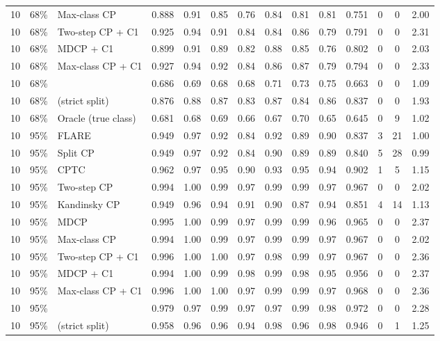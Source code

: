 \begin{longtable}{lllccccccccccc}
10 & 68\% & Max-class CP & 0.888 & 0.91 & 0.85 & 0.76 & 0.84 & 0.81 & 0.81 & 0.751 & 0 & 0 & 2.00 \\
10 & 68\% & Two-step CP + C1 & 0.925 & 0.94 & 0.91 & 0.84 & 0.84 & 0.86 & 0.79 & 0.791 & 0 & 0 & 2.31 \\
10 & 68\% & MDCP + C1 & 0.899 & 0.91 & 0.89 & 0.82 & 0.88 & 0.85 & 0.76 & 0.802 & 0 & 0 & 2.03 \\
10 & 68\% & Max-class CP + C1 & 0.927 & 0.94 & 0.92 & 0.84 & 0.86 & 0.87 & 0.79 & 0.794 & 0 & 0 & 2.33 \\
10 & 68\% & \gamut{} & 0.686 & 0.69 & 0.68 & 0.68 & 0.71 & 0.73 & 0.75 & 0.663 & 0 & 0 & 1.09 \\
10 & 68\% & \gamut{} (strict split) & 0.876 & 0.88 & 0.87 & 0.83 & 0.87 & 0.84 & 0.86 & 0.837 & 0 & 0 & 1.93 \\
10 & 68\% & Oracle (true class) & 0.681 & 0.68 & 0.69 & 0.66 & 0.67 & 0.70 & 0.65 & 0.645 & 0 & 9 & 1.02 \\
\midrule
10 & 95\% & FLARE & 0.949 & 0.97 & 0.92 & 0.84 & 0.92 & 0.89 & 0.90 & 0.837 & 3 & 21 & 1.00 \\
10 & 95\% & Split CP & 0.949 & 0.97 & 0.92 & 0.84 & 0.90 & 0.89 & 0.89 & 0.840 & 5 & 28 & 0.99 \\
10 & 95\% & CPTC & 0.962 & 0.97 & 0.95 & 0.90 & 0.93 & 0.95 & 0.94 & 0.902 & 1 & 5 & 1.15 \\
10 & 95\% & Two-step CP & 0.994 & 1.00 & 0.99 & 0.97 & 0.99 & 0.99 & 0.97 & 0.967 & 0 & 0 & 2.02 \\
10 & 95\% & Kandinsky CP & 0.949 & 0.96 & 0.94 & 0.91 & 0.90 & 0.87 & 0.94 & 0.851 & 4 & 14 & 1.13 \\
10 & 95\% & MDCP & 0.995 & 1.00 & 0.99 & 0.97 & 0.99 & 0.99 & 0.96 & 0.965 & 0 & 0 & 2.37 \\
10 & 95\% & Max-class CP & 0.994 & 1.00 & 0.99 & 0.97 & 0.99 & 0.99 & 0.97 & 0.967 & 0 & 0 & 2.02 \\
10 & 95\% & Two-step CP + C1 & 0.996 & 1.00 & 1.00 & 0.97 & 0.98 & 0.99 & 0.97 & 0.967 & 0 & 0 & 2.36 \\
10 & 95\% & MDCP + C1 & 0.994 & 1.00 & 0.99 & 0.98 & 0.99 & 0.98 & 0.95 & 0.956 & 0 & 0 & 2.37 \\
10 & 95\% & Max-class CP + C1 & 0.996 & 1.00 & 1.00 & 0.97 & 0.99 & 0.99 & 0.97 & 0.968 & 0 & 0 & 2.36 \\
10 & 95\% & \gamut{} & 0.979 & 0.97 & 0.99 & 0.97 & 0.97 & 0.99 & 0.98 & 0.972 & 0 & 0 & 2.28 \\
10 & 95\% & \gamut{} (strict split) & 0.958 & 0.96 & 0.96 & 0.94 & 0.98 & 0.96 & 0.98 & 0.946 & 0 & 1 & 1.25 \\

\end{longtable}
